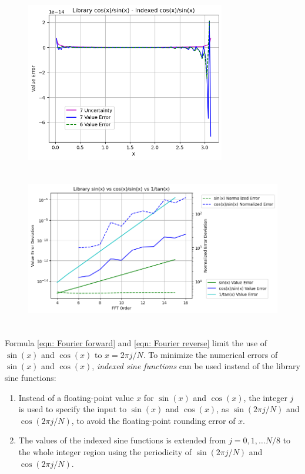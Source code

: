 \documentclass[twoside]{article}
\numberwithin{equation}{section}
\begin{document}
\begin{figure}[p]
\includegraphics[height=2.75in]{Cot_Diff.png} 
\label{fig: Cot_Diff}
\end{figure}

\begin{figure}
\includegraphics[height=2.75in]{Sin_Cot_Diff.png} 
\label{fig: Sin_Cot_Diff}
\end{figure}


Formula \eqref{eqn: Fourier forward} and \eqref{eqn: Fourier reverse} limit the use of $\sin(x)$ and $\cos(x)$ to $x = 2\pi j/N$.
To minimize the numerical errors of $\sin(x)$ and $\cos(x)$, \emph{indexed sine functions} can be used instead of the library sine functions:
\begin{enumerate}
\item Instead of a floating-point value $x$ for $\sin(x)$ and $\cos(x)$, the integer $j$ is used to specify the input to $\sin(x)$ and $\cos(x)$, as $\sin(2\pi j/N)$ and $\cos(2\pi j/N)$, to avoid the floating-point rounding error of $x$.

\item The values of the indexed sine functions is extended from $j = 0,1,\dots N/8$ to the whole integer region using the periodicity of $\sin(2\pi j/N)$ and $\cos(2\pi j/N)$.

\end{enumerate}
\end{document}
